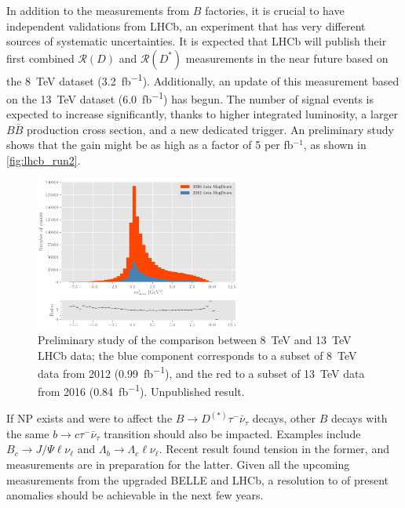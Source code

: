 \documentclass[12pt,letterpaper]{article}
\newcommand{\PRLrule}{
    \bigskip
    \noindent\makebox[\linewidth]{
        \resizebox{0.3333\linewidth}{1pt}{$\blacklozenge$}
    }
    \bigskip
}
\def\RD/{\ensuremath{\mathcal{R}(D)}}
\def\RDst/{\ensuremath{\mathcal{R}(D^{*})}}
\begin{document}
In addition to the measurements from $B$ factories, it is crucial to have independent validations from LHCb, an experiment that has very different sources of systematic uncertainties.
It is expected that LHCb will publish their first combined \RD/ and \RDst/ measurements in the near future based on the \SI{8}{TeV} dataset (\SI{3.2}{fb^{-1}}).
Additionally, an update of this measurement based on the \SI{13}{TeV} dataset (\SI{6.0}{fb^{-1}}) has begun.
The number of signal events is expected to increase significantly,
thanks to higher integrated luminosity, a larger $B \bar{B}$ production
cross section, and a new dedicated trigger.
An preliminary study shows that the gain might be as high as a factor of 5 per fb$^{-1}$, 
as shown in \autoref{fig:lhcb_run2}.

\begin{figure}[ht]
    \centering
    \includegraphics[width=0.6\textwidth]{figs/lhcb_run2.pdf}
    \caption{
        Preliminary study of the comparison between \SI{8}{TeV} and \SI{13}{TeV} LHCb data;
        the blue component corresponds to a subset of \SI{8}{TeV} data from 2012 (\SI{0.99}{fb^{-1}}), and the red to a subset of \SI{13}{TeV} data from 2016 (\SI{0.84}{fb^{-1}}).
        Unpublished result.
    }
    \label{fig:lhcb_run2}
\end{figure}

If NP exists and were to affect the $B \rightarrow D^{(*)} \tau^- \bar{\nu}_\tau$ decays,
other $B$ decays with the same $b \rightarrow c \tau^- \bar{\nu}_\tau$ transition should also be impacted.
Examples include
$B_c \rightarrow J/\Psi \ell \nu_\ell$ and
$\Lambda_b \rightarrow \Lambda_c \ell \nu_\ell$.
Recent result \cite{} found tension in the former, and measurements are in preparation for the latter.
Given all the upcoming measurements from the upgraded BELLE and LHCb, a resolution to of present anomalies should be achievable in the next few years.

\FloatBarrier
\PRLrule
\printbibliography
\end{document}
